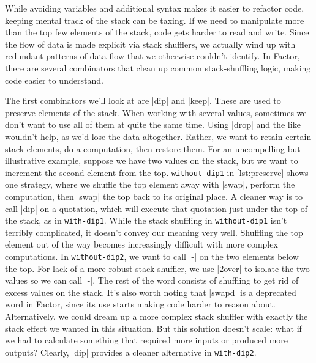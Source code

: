 While avoiding variables and additional syntax makes it easier to refactor
code, keeping mental track of the stack can be taxing.  If we need to
manipulate more than the top few elements of the stack, code gets harder to
read and write.  Since the flow of data is made explicit via stack shufflers,
we actually wind up with redundant patterns of data flow that we otherwise
couldn't identify.  In Factor, there are several combinators that clean up
common stack-shuffling logic, making code easier to understand.


The first combinators we'll look at are \factor|dip| and \factor|keep|.  These
are used to preserve elements of the stack.  When working with several values,
sometimes we don't want to use all of them at quite the same time.  Using
\factor|drop| and the like wouldn't help, as we'd lose the data altogether.
Rather, we want to retain certain stack elements, do a computation, then
restore them.  For an uncompelling but illustrative example, suppose we have
two values on the stack, but we want to increment the second element from the
top.  \Verb|without-dip1| in \cref{lst:preserve} shows one strategy, where we
shuffle the top element away with \factor|swap|, perform the computation, then
\factor|swap| the top back to its original place.  A cleaner way is to call
\factor|dip| on a quotation, which will execute that quotation just under the
top of the stack, as in \Verb|with-dip1|.  While the stack shuffling in
\Verb|without-dip1| isn't terribly complicated, it doesn't convey our meaning
very well.  Shuffling the top element out of the way becomes increasingly
difficult with more complex computations.  In \Verb|without-dip2|, we want to
call \factor|-| on the two elements below the top.  For lack of a more robust
stack shuffler, we use \factor|2over| to isolate the two values so we can call
\factor|-|.  The rest of the word consists of shuffling to get rid of excess
values on the stack.  It's also worth noting that \factor|swapd| is a
deprecated word in Factor, since its use starts making code harder to reason
about.  Alternatively, we could dream up a more complex stack shuffler with
exactly the stack effect we wanted in this situation.  But this solution
doesn't scale: what if we had to calculate something that required more inputs
or produced more outputs?  Clearly, \factor|dip| provides a cleaner alternative
in \Verb|with-dip2|.

